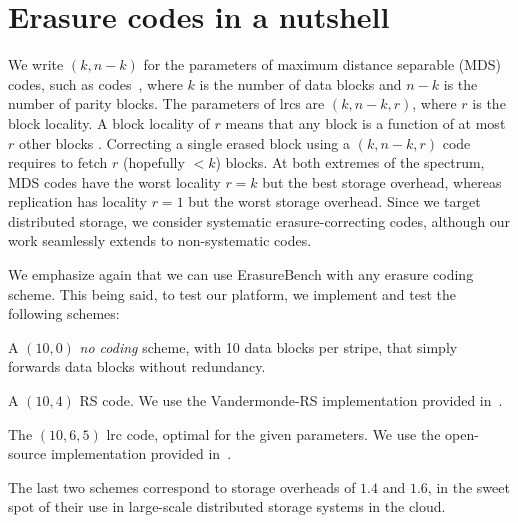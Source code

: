 \section{Erasure codes in a nutshell}
\label{sec:codes}

We write $(k,n-k)$ for the parameters of maximum distance separable (MDS) codes, such as  codes~\autocite{reed-solomon}, where $k$ is the number of data blocks and $n-k$ is the number of parity blocks. 
The parameters of \acp{lrc} are  $(k,n-k,r)$, where $r$ is the block locality. 
A block locality of $r$ means that any block is a function of at most $r$ other blocks \autocite{XorbasVLDB}. Correcting a single erased block using a $(k,n-k,r)$ code requires to fetch $r$ (hopefully $<k$) blocks. 
At both extremes of the spectrum, MDS codes have the worst locality $r=k$ but the best storage overhead, whereas replication has locality $r=1$ but the worst storage overhead. 
Since we target distributed storage, we consider systematic erasure-correcting codes, although our work seamlessly extends to non-systematic codes. %

We emphasize again that we can use ErasureBench with any erasure coding scheme. This being said, to test our platform, we implement and test the following schemes:
\begin{description}
\item[\textbf{NC}] A $(10,0)$ \emph{no coding} scheme, with 10 data blocks per stripe, that simply forwards data blocks without redundancy. %
\item[\textbf{\acs{rs}}] A $(10,4)$ RS code. We use the Vandermonde-RS implementation provided in~\autocite{XorbasVLDB}.  
\item[\textbf{\acs{lrc}}] The $(10,6,5)$ \acs{lrc} code, optimal for the given parameters. We use the open-source implementation provided in~\autocite{XorbasVLDB}.
\end{description}
The last two schemes correspond to storage overheads of $1.4$ and $1.6$, in the sweet spot of their use in large-scale distributed storage systems in the cloud.
